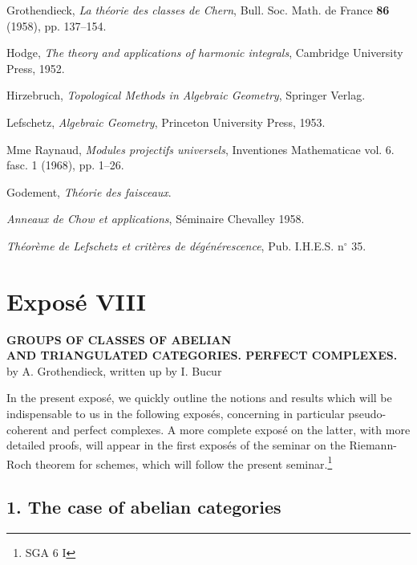 \documentclass[11pt]{article}
\begin{document}
\begin{enumerate}[label={[\arabic*]}]
\item Grothendieck, \emph{La théorie des classes de Chern}, Bull. Soc. Math. de France \textbf{86} (1958), pp. 137--154.
\item Hodge, \emph{The theory and applications of harmonic integrals}, Cambridge University Press, 1952.
\item Hirzebruch, \emph{Topological Methods in Algebraic Geometry}, Springer Verlag.
\item Lefschetz, \emph{Algebraic Geometry}, Princeton University Press, 1953.
\item Mme Raynaud, \emph{Modules projectifs universels}, Inventiones Mathematicae vol. 6. fasc. 1 (1968), pp. 1--26.
\item[{[TF]}] Godement, \emph{Théorie des faisceaux}.
\item[{[CH]}] \emph{Anneaux de Chow et applications}, Séminaire Chevalley 1958.
\item[{[6]}] \emph{Théorème de Lefschetz et critères de dégénérescence}, Pub. I.H.E.S. n$^\circ$ 35.
\end{enumerate}


\newpage
{}\label{sga5:VIII:expose:viii}\section*{Exposé VIII}

\begin{center}
\textbf{GROUPS OF CLASSES OF ABELIAN}\\
\textbf{AND TRIANGULATED CATEGORIES. PERFECT COMPLEXES.}\\[1ex]
by A. Grothendieck, written up by I. Bucur
\end{center}

In the present exposé, we quickly outline the notions and results which will be indispensable to us in the following exposés, concerning in particular pseudo-coherent and perfect complexes. A more complete exposé on the latter, with more detailed proofs, will appear in the first exposés of the seminar on the Riemann-Roch theorem for schemes, which will follow the present seminar.\footnote{SGA 6 I}

\subsection*{1. The case of abelian categories}\label{sga5:VIII:subsection:1}
\end{document}
